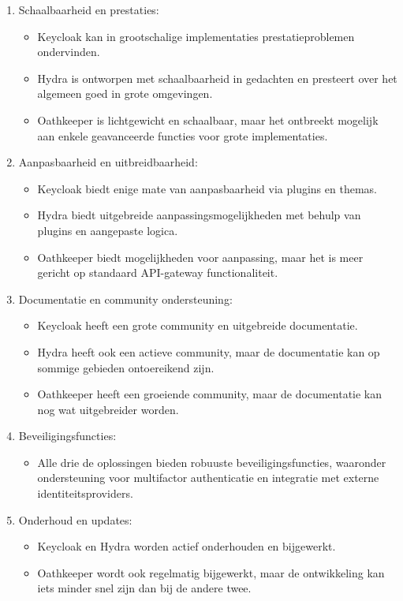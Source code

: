 \begin{enumerate}
  \item Schaalbaarheid en prestaties:
  \begin{itemize}
    \item Keycloak kan in grootschalige implementaties prestatieproblemen ondervinden.
    \item Hydra is ontworpen met schaalbaarheid in gedachten en presteert over het algemeen goed in grote omgevingen.
    \item Oathkeeper is lichtgewicht en schaalbaar, maar het ontbreekt mogelijk aan enkele geavanceerde functies voor grote implementaties.
  \end{itemize}
  
  \item Aanpasbaarheid en uitbreidbaarheid:
  \begin{itemize}
    \item Keycloak biedt enige mate van aanpasbaarheid via plugins en themas.
    \item Hydra biedt uitgebreide aanpassingsmogelijkheden met behulp van plugins en aangepaste logica.
    \item Oathkeeper biedt mogelijkheden voor aanpassing, maar het is meer gericht op standaard API-gateway functionaliteit.
  \end{itemize}
  
  \item Documentatie en community ondersteuning:
  \begin{itemize}
    \item Keycloak heeft een grote community en uitgebreide documentatie.
    \item Hydra heeft ook een actieve community, maar de documentatie kan op sommige gebieden ontoereikend zijn.
    \item Oathkeeper heeft een groeiende community, maar de documentatie kan nog wat uitgebreider worden.
  \end{itemize}
  
  \item Beveiligingsfuncties:
  \begin{itemize}
    \item Alle drie de oplossingen bieden robuuste beveiligingsfuncties, waaronder ondersteuning voor multifactor authenticatie en integratie met externe identiteitsproviders.
  \end{itemize}
  
  \item Onderhoud en updates:
  \begin{itemize}
    \item Keycloak en Hydra worden actief onderhouden en bijgewerkt.
    \item Oathkeeper wordt ook regelmatig bijgewerkt, maar de ontwikkeling kan iets minder snel zijn dan bij de andere twee.
  \end{itemize}
  

\end{enumerate}
